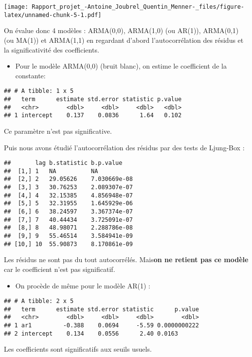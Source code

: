 \documentclass[
  landscape]{article}
\providecommand{\tightlist}{%
  \setlength{\itemsep}{0pt}\setlength{\parskip}{0pt}}
\begin{document}
\texttt{[image: Rapport\_projet\_-Antoine\_Joubrel\_Quentin\_Menner-\_files/figure-latex/unnamed-chunk-5-1.pdf]}

On évalue donc 4 modèles : ARMA(0,0), ARMA(1,0) (ou AR(1)), ARMA(0,1)
(ou MA(1)) et ARMA(1,1) en regardant d'abord l'autocorrélation des
résidus et la significativité des coefficients.

\begin{itemize}
\tightlist
\item
  Pour le modèle ARMA(0,0) (bruit blanc), on estime le coefficient de la
  constante:
\end{itemize}

\begin{verbatim}
## # A tibble: 1 x 5
##   term      estimate std.error statistic p.value
##   <chr>        <dbl>     <dbl>     <dbl>   <dbl>
## 1 intercept    0.137    0.0836      1.64   0.102
\end{verbatim}

Ce paramètre n'est pas significative.

Puis nous avons étudié l'autocorrélation des résidus par des tests de
Ljung-Box :

\begin{verbatim}
##       lag b.statistic b.p.value   
##  [1,] 1   NA          NA          
##  [2,] 2   29.05626    7.030669e-08
##  [3,] 3   30.76253    2.089307e-07
##  [4,] 4   32.15385    4.856948e-07
##  [5,] 5   32.31955    1.645929e-06
##  [6,] 6   38.24597    3.367374e-07
##  [7,] 7   40.44434    3.725091e-07
##  [8,] 8   48.98071    2.288786e-08
##  [9,] 9   55.46514    3.584941e-09
## [10,] 10  55.90873    8.170861e-09
\end{verbatim}

Les résidus ne sont pas du tout autocorrélés. Mais\textbf{on ne retient
pas ce modèle} car le coefficient n'est pas significatif.

\begin{itemize}
\tightlist
\item
  On procède de même pour le modèle AR(1) :
\end{itemize}

\begin{verbatim}
## # A tibble: 2 x 5
##   term      estimate std.error statistic      p.value
##   <chr>        <dbl>     <dbl>     <dbl>        <dbl>
## 1 ar1         -0.388    0.0694     -5.59 0.0000000222
## 2 intercept    0.134    0.0556      2.40 0.0163
\end{verbatim}

Les coefficients sont significatifs aux seuils usuels.
\end{document}
